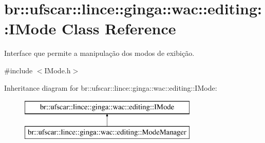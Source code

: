 \hypertarget{classbr_1_1ufscar_1_1lince_1_1ginga_1_1wac_1_1editing_1_1IMode}{
\section{br::ufscar::lince::ginga::wac::editing::IMode Class Reference}
\label{classbr_1_1ufscar_1_1lince_1_1ginga_1_1wac_1_1editing_1_1IMode}
}


Interface que permite a manipulação dos modos de exibição.  




{\ttfamily \#include $<$IMode.h$>$}

Inheritance diagram for br::ufscar::lince::ginga::wac::editing::IMode:\begin{figure}[H]
\begin{center}
\leavevmode
\includegraphics[height=2cm]{classbr_1_1ufscar_1_1lince_1_1ginga_1_1wac_1_1editing_1_1IMode}
\end{center}
\end{figure}
